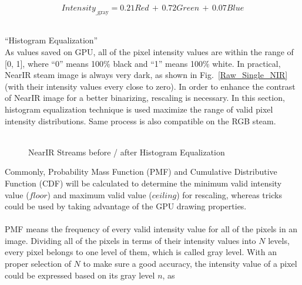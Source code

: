 \begin{equation}
%
Intensity_{\text{\_gray}} =  0.21 Red\,  + \, 0.72 Green \, + \, 0.07 Blue
%
\end{equation}%
%
\\\par%
 \qquad \enquote{Histogram Equalization}\\%
As values saved on GPU, all of the pixel intensity values are within the range of [0, 1], where \enquote{0} means 100\% black and \enquote{1}  means 100\% white. In practical, NearIR steam image is always very dark, as shown in Fig.~\ref{Raw_Single_NIR} (with their intensity values every close to zero).  In order to enhance the contrast of NearIR image for a better binarizing, rescaling is necessary. In this section, histogram equalization technique is used maximize the range of valid pixel intensity distributions. Same process is also compatible on the RGB steam.\\\\
%
 \begin{figure}[t]
\hspace*{-0.5cm}
\centering
{}
\caption{NearIR Streams before / after Histogram Equalization}
\label{Histogram_Equalization}
\end{figure}%
%
Commonly, Probability Mass Function (PMF) and Cumulative Distributive Function (CDF) will be calculated to determine the minimum valid intensity value (\(floor\)) and maximum valid value (\(ceiling\)) for rescaling, whereas tricks could be used by taking advantage of the GPU drawing properties.\\%
\\%
PMF means the frequency of every valid intensity value for all of the pixels in an image. Dividing all of the pixels in terms of their intensity values into \(N\) levels, every pixel belongs to one level of them, which is called gray level. With an proper selection of \(N\) to make sure a good accuracy, the intensity value of a pixel could be expressed based on its gray level \(n\), as\par%

